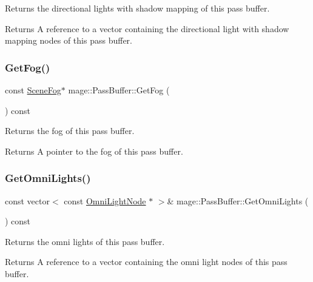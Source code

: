 Returns the directional lights with shadow mapping of this pass buffer.

\begin{DoxyReturn}{Returns}
A reference to a vector containing the directional light with shadow mapping nodes of this pass buffer. 
\end{DoxyReturn}
\hypertarget{structmage_1_1_pass_buffer_a406b7dcb655d3689f0a4400edc2e9bf8}{}\label{structmage_1_1_pass_buffer_a406b7dcb655d3689f0a4400edc2e9bf8} 
\subsubsection{\texorpdfstring{Get\+Fog()}{GetFog()}}
{\footnotesize\ttfamily const \hyperlink{classmage_1_1_scene_fog}{Scene\+Fog}$\ast$ mage\+::\+Pass\+Buffer\+::\+Get\+Fog (\begin{DoxyParamCaption}{ }\end{DoxyParamCaption}) const\hspace{0.3cm}{\ttfamily [noexcept]}}

Returns the fog of this pass buffer.

\begin{DoxyReturn}{Returns}
A pointer to the fog of this pass buffer. 
\end{DoxyReturn}
\hypertarget{structmage_1_1_pass_buffer_a9d085a3784f6e64777b720c8702e2f3e}{}\label{structmage_1_1_pass_buffer_a9d085a3784f6e64777b720c8702e2f3e} 
\subsubsection{\texorpdfstring{Get\+Omni\+Lights()}{GetOmniLights()}}
{\footnotesize\ttfamily const vector$<$ const \hyperlink{namespacemage_a1724c6e6b6b5ba535cdd967cbbb4a669}{Omni\+Light\+Node} $\ast$ $>$\& mage\+::\+Pass\+Buffer\+::\+Get\+Omni\+Lights (\begin{DoxyParamCaption}{ }\end{DoxyParamCaption}) const\hspace{0.3cm}{\ttfamily [noexcept]}}

Returns the omni lights of this pass buffer.

\begin{DoxyReturn}{Returns}
A reference to a vector containing the omni light nodes of this pass buffer. 
\end{DoxyReturn}
\hypertarget{structmage_1_1_pass_buffer_a678adead392b68b985437d3147a6fd38}{}\label{structmage_1_1_pass_buffer_a678adead392b68b985437d3147a6fd38} 
